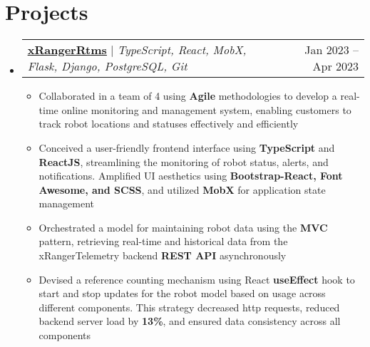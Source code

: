 \documentclass[letterpaper,11pt]{article}
\makeatletter
\newcommand{\resumeItem}[1]{
  \item\small{
    {#1 \vspace{-2pt}}
  }
}
\newcommand{\resumeProjectHeading}[2]{
    \item
    \begin{tabular*}{0.97\textwidth}{l@{\extracolsep{\fill}}r}
      \small#1 & #2 \\
    \end{tabular*}\vspace{-7pt}
}
\newcommand{\resumeSubHeadingListStart}{\begin{itemize}[leftmargin=0.15in, label={}]}
\newcommand{\resumeSubHeadingListEnd}{\end{itemize}}
\newcommand{\resumeItemListStart}{\begin{itemize}}
\newcommand{\resumeItemListEnd}{\end{itemize}\vspace{-5pt}}
\makeatother
\begin{document}
\section{Projects}
    \resumeSubHeadingListStart
      \resumeProjectHeading
          {\textbf{\underline{\href{https://github.com/xRanger-RTMS}{xRangerRtms}}} $|$ \emph{TypeScript, React, MobX, Flask, Django, PostgreSQL, Git}}{Jan 2023 -- Apr 2023}
          \resumeItemListStart
            \resumeItem{Collaborated in a team of 4 using \textbf{Agile} methodologies to develop a real-time online monitoring and management system, enabling customers to track robot locations and statuses effectively and efficiently}
            \resumeItem{Conceived a user-friendly frontend interface using \textbf{TypeScript} and \textbf{ReactJS}, streamlining the monitoring of robot status, alerts, and notifications. Amplified UI aesthetics using \textbf{Bootstrap-React, Font Awesome, and SCSS}, and utilized \textbf{MobX} for application state management}
            \resumeItem{Orchestrated a model for maintaining robot data using the \textbf{MVC} pattern, retrieving real-time and historical data from the xRangerTelemetry backend \textbf{REST API} asynchronously}
            \resumeItem{Devised a reference counting mechanism using React \textbf{useEffect} hook to start and stop updates for the robot model based on usage across different components. This strategy decreased http requests, reduced backend server load by \textbf{13\%}, and ensured data consistency across all components}
          \resumeItemListEnd
    \resumeSubHeadingListEnd
\end{document}
